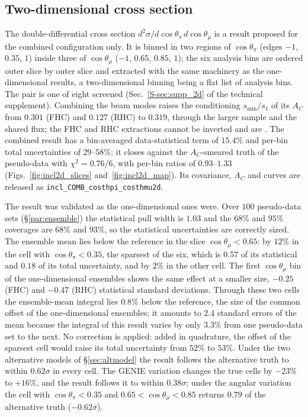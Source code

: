 \documentclass[11pt,a4paper]{article}
\newcommand{\suppref}[2]{#1~\ref{S-#2} of the technical supplement}
\begin{document}
\subsection{Two-dimensional cross section}
\label{sec:incl_2d}

The double-differential cross section $d^2\sigma/d\cos\theta_\pi\,d\cos\theta_\mu$ is a result proposed for the combined configuration only. It is binned in two regions of
$\cos\theta_\pi$ (edges $-1$, $0.35$, $1$) inside three of $\cos\theta_\mu$ ($-1$, $0.65$, $0.85$, $1$);
the six analysis bins are ordered outer slice by outer slice and extracted with the same machinery as
the one-dimensional results, a two-dimensional binning being a flat list of analysis bins. The pair is
one of eight screened (\suppref{Sec.}{sec:supp_2d}). Combining the beam modes raises the conditioning
$s_{\min}/s_1$ of its $A_C$ from $0.301$ (FHC) and $0.127$ (RHC) to $0.319$, through the larger sample
and the shared flux; the FHC and RHC extractions cannot be inverted and are \statNotReported. The
combined result has a bin-averaged data-statistical term of $15.4\%$ and per-bin total uncertainties of
$29$--$58\%$; it closes against the $A_C$-smeared truth of the pseudo-data with $\chi^2=0.76/6$, with
per-bin ratios of $0.93$--$1.33$ (Figs.~\ref{fig:incl2d_slices} and~\ref{fig:incl2d_map}). Its
covariance, $A_C$ and curves are released as \texttt{incl\_COMB\_costhpi\_costhmu2d}.

The result was validated as the one-dimensional ones were. Over $100$ pseudo-data
sets (\S\ref{par:ensemble}) the statistical pull width is $1.03$ and the $68\%$ and $95\%$ coverages are
$68\%$ and $93\%$, so the statistical uncertainties are correctly sized. The ensemble mean lies below the
reference in the slice $\cos\theta_\mu<0.65$: by $12\%$ in the cell with $\cos\theta_\pi<0.35$, the
sparsest of the six, which is $0.57$ of its statistical and $0.18$ of its total uncertainty, and by
$2\%$ in the other cell. The first $\cos\theta_\mu$ bin of the one-dimensional ensembles shows the
same effect at a smaller size, $-0.25$ (FHC) and $-0.47$ (RHC) statistical standard deviations. Through
these two cells the ensemble-mean integral lies $0.8\%$ below the reference, the size of the common
offset of the one-dimensional ensembles; it amounts to $2.4$ standard errors of the mean because the integral of this result varies by only $3.3\%$ from one pseudo-data set to
the next. No correction is
applied: added in quadrature, the offset of the sparsest cell would raise its total uncertainty from
$52\%$ to $53\%$. Under the two alternative models of \S\ref{sec:altmodel} the result follows the
alternative truth to within $0.62\sigma$ in every cell. The GENIE variation changes the true cells by
$-23\%$ to $+16\%$, and the result follows it to within $0.38\sigma$; under the angular variation the
cell with $\cos\theta_\pi<0.35$ and $0.65<\cos\theta_\mu<0.85$ returns $0.79$ of the alternative
truth ($-0.62\sigma$).
\end{document}
